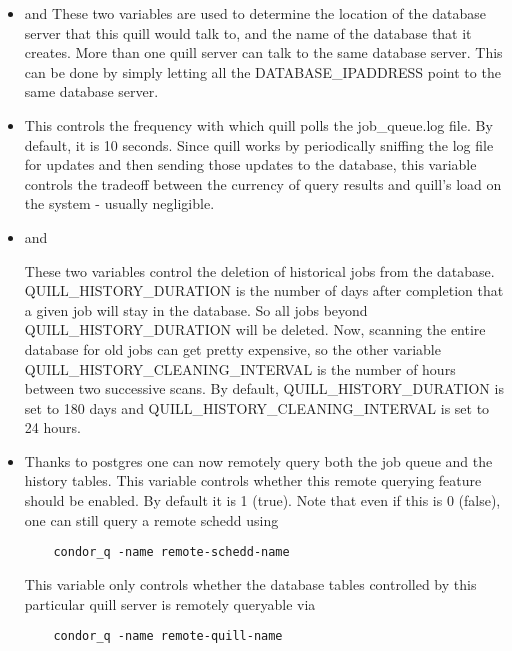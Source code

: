 \begin{enumerate}
\begin{itemize}
\item {} and 
These two variables are used to determine the location of the database
server that this quill would talk to, and the name of the database that
it creates.  More than one quill server can talk to the same database
server.  This can be done by simply letting all the DATABASE\_IPADDRESS
point to the same database server.


\item {}
This controls the frequency with which quill polls the job\_queue.log file.
By default, it is 10 seconds.  Since quill works by periodically sniffing
the log file for updates and then sending those updates to the database,
this variable controls the tradeoff between the currency of query results
and quill's load on the system - usually negligible.

\item {} and 

These two variables control the deletion of historical jobs from
the database.  QUILL\_HISTORY\_DURATION is the number of days after
completion that a given job will stay in the database.  So all jobs beyond
QUILL\_HISTORY\_DURATION will be deleted.  Now, scanning the entire
database for old jobs can get pretty expensive, so the other variable
QUILL\_HISTORY\_CLEANING\_INTERVAL is the number of hours between two
successive scans.  By default, QUILL\_HISTORY\_DURATION is set to 180
days and QUILL\_HISTORY\_CLEANING\_INTERVAL is set to 24 hours.

\item {}
Thanks to postgres one can now remotely query both the job queue and the
history tables. This variable controls whether this remote querying 
feature should be enabled.  By default it is 1 (true).  Note that even if 
this is 0 (false), one can still query a remote schedd using 
\begin{verbatim}
	condor_q -name remote-schedd-name
\end{verbatim}
This variable only controls whether the database tables controlled by this 
particular quill server is remotely queryable via
\begin{verbatim}
	condor_q -name remote-quill-name
\end{verbatim}


\end{itemize}
\end{enumerate}
